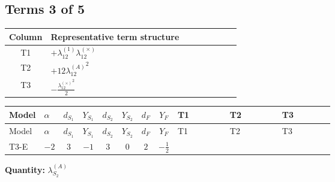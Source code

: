 \documentclass[8pt]{article}
\begin{document}
\begin{landscape}
\subsection*{Terms 3 of 5}
\begin{center}
\begin{tabular}{@{}c >{\raggedright\arraybackslash}p{0.82\linewidth}@{}}
\toprule
Column & Representative term structure \\
\midrule
T1 & \(\displaystyle +{\lambda_{12}^{(1)}} {\lambda_{12}^{(\times)}}\) \\
\midrule
T2 & \(\displaystyle +12 {\lambda_{12}^{(A)}}^2\) \\
\midrule
T3 & \(\displaystyle -\frac{{\lambda_{12}^{(\times)}}^2}{2}\) \\
\midrule
\bottomrule
\end{tabular}
\end{center}
\smallskip
\tiny
\begin{longtable}{@{}llcccccc >{\raggedright\arraybackslash}p{0.21\linewidth} >{\raggedright\arraybackslash}p{0.21\linewidth} >{\raggedright\arraybackslash}p{0.21\linewidth}@{}}
\toprule
Model & $\alpha$ & $d_{S_1}$ & $Y_{S_1}$ & $d_{S_2}$ & $Y_{S_2}$ & $d_F$ & $Y_F$ & T1 & T2 & T3 \\
\midrule
\endfirsthead
\toprule
Model & $\alpha$ & $d_{S_1}$ & $Y_{S_1}$ & $d_{S_2}$ & $Y_{S_2}$ & $d_F$ & $Y_F$ & T1 & T2 & T3 \\
\midrule
\endhead
T3-E & $-2$ & $3$ & $-1$ & $3$ & $0$ & $2$ & $-\frac{1}{2}$ & \scriptsize\adjustbox{max width=\linewidth}{$\begin{gathered} +{\lambda_{12}^{(1)}} {\lambda_{12}^{(\times)}}\end{gathered}$} & \scriptsize\adjustbox{max width=\linewidth}{$\begin{gathered} +12 {\lambda_{12}^{(A)}}^2\end{gathered}$} & \scriptsize\adjustbox{max width=\linewidth}{$\begin{gathered} -\frac{{\lambda_{12}^{(\times)}}^2}{2}\end{gathered}$} \\
\midrule
\bottomrule
\end{longtable}
\clearpage
\noindent\textbf{Quantity: }$\lambda_{S_2}^{(A)}$\par\smallskip

\end{landscape}
\end{document}
